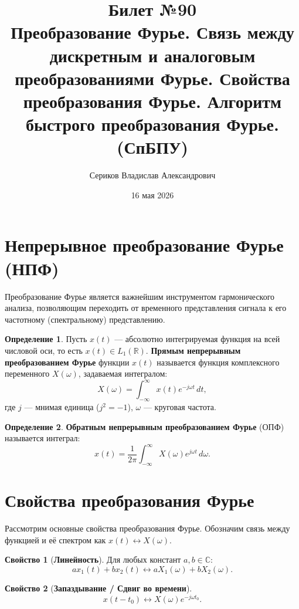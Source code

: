 \documentclass[12pt,a4paper]{article}
\title{Билет №90 \\ \small Преобразование Фурье. Связь между дискретным и аналоговым преобразованиями Фурье. Свойства преобразования Фурье. Алгоритм быстрого преобразования Фурье. (СпБПУ)}
\author{Сериков Владислав Александрович}
\date{16 мая 2026}
\theoremstyle{definition}
\newtheorem{definition}{Определение}
\newtheorem{property}{Свойство}
\begin{document}
\maketitle
\tableofcontents
\newpage

\section{Непрерывное преобразование Фурье (НПФ)}

Преобразование Фурье является важнейшим инструментом гармонического анализа, позволяющим переходить от временного представления сигнала к его частотному (спектральному) представлению.

\begin{definition}
Пусть $x(t)$ — абсолютно интегрируемая функция на всей числовой оси, то есть $x(t) \in L_1(\mathbb{R})$. \textbf{Прямым непрерывным преобразованием Фурье} функции $x(t)$ называется функция комплексного переменного $X(\omega)$, задаваемая интегралом:
\begin{equation}
    X(\omega) = \int_{-\infty}^{\infty} x(t) e^{-j\omega t} \, dt,
\end{equation}
где $j$ — мнимая единица ($j^2 = -1$), $\omega$ — круговая частота.
\end{definition}

\begin{definition}
\textbf{Обратным непрерывным преобразованием Фурье} (ОПФ) называется интеграл:
\begin{equation}
    x(t) = \frac{1}{2\pi} \int_{-\infty}^{\infty} X(\omega) e^{j\omega t} \, d\omega.
\end{equation}
\end{definition}

\section{Свойства преобразования Фурье}

Рассмотрим основные свойства преобразования Фурье. Обозначим связь между функцией и её спектром как $x(t) \leftrightarrow X(\omega)$.

\begin{property}[\textbf{Линейность}]
Для любых констант $a, b \in \mathbb{C}$:
$$ a x_1(t) + b x_2(t) \leftrightarrow a X_1(\omega) + b X_2(\omega). $$
\end{property}

\begin{property}[\textbf{Запаздывание / Сдвиг во времени}]
$$ x(t - t_0) \leftrightarrow X(\omega) e^{-j\omega t_0}. $$
\end{property}
\end{document}
